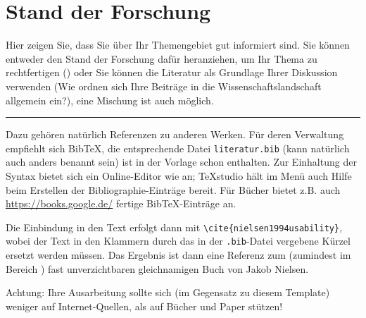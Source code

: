 
\chapter{Stand der Forschung}
Hier zeigen Sie, dass Sie über Ihr Themengebiet gut informiert sind. Sie können entweder den Stand der Forschung dafür heranziehen, um Ihr Thema zu rechtfertigen () oder Sie können die Literatur als Grundlage Ihrer Diskussion verwenden (Wie ordnen sich Ihre Beiträge in die Wissenschaftslandschaft allgemein ein?), eine Mischung ist auch möglich.

\hfil\rule{0.4\textwidth}{0.4pt}

Dazu gehören natürlich Referenzen zu anderen Werken. Für deren Verwaltung empfiehlt sich BibTeX, die entsprechende Datei \verb|literatur.bib| (kann natürlich auch anders benannt sein) ist in der Vorlage schon enthalten. Zur Einhaltung der Syntax bietet sich ein Online-Editor wie \cite{BibTexOnlineEditor} an; TeXstudio \cite{texstudio} hält im Menü auch Hilfe beim Erstellen der Bibliographie-Einträge bereit. Für Bücher bietet z.B. auch \url{https://books.google.de/} fertige BibTeX-Einträge an.

Die Einbindung in den Text erfolgt dann mit \verb|\cite{nielsen1994usability}|, wobei der Text in den Klammern durch das in der \verb|.bib|-Datei vergebene Kürzel ersetzt werden müssen. Das Ergebnis ist dann eine Referenz zum (zumindest im Bereich ) fast unverzichtbaren gleichnamigen Buch \cite{nielsen1994usability} von Jakob Nielsen.

Achtung: Ihre Ausarbeitung sollte sich (im Gegensatz zu diesem Template) weniger auf Internet-Quellen, als auf Bücher und Paper stützen!
\\

\Blindtext[5]
